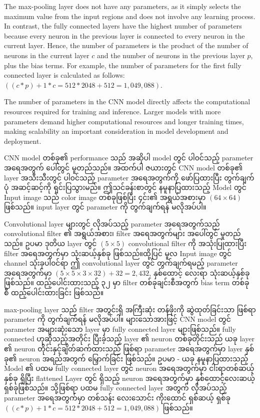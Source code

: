 The max-pooling layer does not have any parameters, as it simply selects the maximum value from the input regions and does not involve any learning process. In contrast, the fully connected layers have the highest number of parameters because every neuron in the previous layer is connected to every neuron in the current layer. Hence, the number of parameters is the product of the number of neurons in the current layer $c$ and the number of neurons in the previous layer $p$, plus the bias terms. For example, the number of parameters for the first fully connected layer is calculated as follows: $((c * p)+1*c = 512*2048 + 512 = 1,049,088)$.

The number of parameters in the CNN model directly affects the computational resources required for training and inference. Larger models with more parameters demand higher computational resources and longer training times, making scalability an important consideration in model development and deployment.

CNN model တစ်ခု၏ performance သည် အဆိုပါ model တွင် ပါ၀င်သည့် parameter အရေအတွက် ပေါ်တွင် မူတည်သည်။ အထက်ပါ ဇယားတွင် CNN model တစ်ခု၏ layer အသီးသီးတွင် ပါ၀င်သည့် parameter အရေအတွက်ကို ဖော်ပြထားပြီး တွက်ချက်ပုံ အဆင့်ဆင့်ကို ရှင်းပြသွားမည်။ ဤသင်ခန်းစာတွင် နမူနာပြထားသည့် Model တွင် Input image သည် color image တစ်ခုဖြစ်ပြီး ၄င်း၏ အရွယ်အစားမှာ  $(64 \times  64)$ ဖြစ်သည်။ input layer တွင် parameter ကို တွက်ချက်ရန် မလိုအပ်ပါ။  

Convolutional layer များတွင် လိုအပ်သည့် parameter အရေအတွက်သည် convolutional filter ၏ အရွယ်အစား၊ filter အရေအတွက်များ အပေါ်တွင် မူတည်သည်။ ဥပမာ ဒုတိယ layer တွင်  $(5 \times 5 )$ convolutional filter ကို အသုံးပြုထားပြီး filter အရေအတွက်မှာ သုံးဆယ့်နှစ်ခု ဖြစ်သည်။ထို့ပြင် မူလ Input image တွင် channel သုံးခုပါ၀င်ရာ ဤ convolutional layer တွင် တွက်ချက်ရမည့် parameter အရေအတွက်မှာ $(5 \times 5 \times 3 \times 32) + 32 = 2,432$, နှစ်ထောင့် လေးရာ သုံးဆယ့်နှစ်ခု ဖြစ်သည်။ ထည့်ပေါင်းထားသည့် ၃၂ မှာ filter တစ်ခုချင်းစီအတွက် bias term တစ်ခု စီ ထည့်ပေါင်းထားခြင်း ဖြစ်သည်။ 

max-pooling layer သည် filter အတွင်းရှိ အကြီးဆုံး တန်ဖိုးကို ဆွဲထုတ်ခြင်းသာ ဖြစ်ရာ parameter ကို တွက်ချက်ရန် မလိုအပ်ပါ။  များသောအားဖြင့် CNN model  တွင် parameter အများဆုံးသော layer မှာ fully connected layer များဖြစ်သည်။ fully connected ဟုဆိုသည့်အတိုင်း ပြီးခဲ့သည့် layer ၏ neuron တစ်ခုတိုင်းသည် ယခု layer ၏ neuron တိုင်းနှင့်ချိတ်ဆက်ထားသည် ဖြစ်ရာ parameter အရေအတွက်မှာ  layer နှစ်ခု၏ neuron  အရည်အတွက် မြှောက်ခြင်း ဖြစ်သည်။ ဥပမာ - ယခု နမူနာပြထားသည့် Model ၏ ပထမ fully connected layer တွင် neuron အရေအတွက်မှာ  ငါးရာတစ်ဆယ့်နှစ်ခု ရှိပြီး flattened Layer တွင် ရှိသည့် neuron အရေအတွက်မှာ  နှစ်ထောင့်လေးဆယ့်ရှစ်ခုဖြစ်သည်။ သို့ဖြစ်ရာ ပထမ fully connected layer အတွက်  လိုအပ်သည့် parameter အရေအတွက်မှာ တစ်သန်း လေးသောင်း ကိုးထောင် ရှစ်ဆယ့် ရှစ်ခု $((c * p)+1*c = 512*2048 + 512 = 1,049,088)$ ဖြစ်သည်။ 

